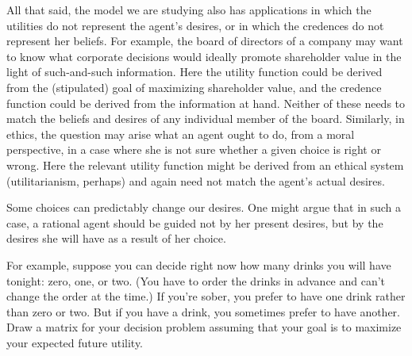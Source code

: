 



All that said, the model we are studying also has applications in
which the utilities do not represent the agent's desires, or in which
the credences do not represent her beliefs. For example, the board of
directors of a company may want to know what corporate decisions would
ideally promote shareholder value in the light of such-and-such
information. Here the utility function could be derived from the
(stipulated) goal of maximizing shareholder value, and the credence
function could be derived from the information at hand. Neither of
these needs to match the beliefs and desires of any individual member
of the board. Similarly, in ethics, the question may arise what an
agent ought to do, from a moral perspective, in a case where she is
not sure whether a given choice is right or wrong. Here the relevant
utility function might be derived from an ethical system
(utilitarianism, perhaps) and again need not match the agent's actual
desires.

\begin{exercise3}
  Some choices can predictably change our desires. One might argue that in such
  a case, a rational agent should be guided not by her present desires, but by
  the desires she will have as a result of her choice.

  For example, suppose you can decide right now how many drinks you will have
  tonight: zero, one, or two. (You have to order the drinks in advance and can't
  change the order at the time.) If you're sober, you prefer to have one drink
  rather than zero or two. But if you have a drink, you sometimes prefer to have
  another. Draw a matrix for your decision problem assuming that your goal is to
  maximize your expected future utility.
\end{exercise3}


